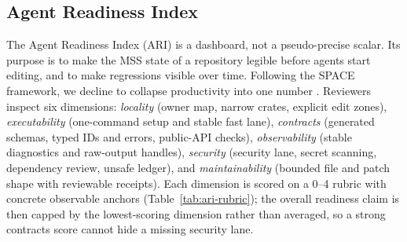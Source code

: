 \documentclass[conference]{IEEEtran}
\newcommand{\ari}{\textnormal{\textsc{ARI}}}
\newcommand{\mss}{\textnormal{\textsc{MSS}}}
\begin{document}
\subsection{Agent Readiness Index}
\label{sec:ari}
The Agent Readiness Index (\ari) is a dashboard, not a pseudo-precise scalar. Its purpose is to make the \mss{} state of a repository legible before agents start editing, and to make regressions visible over time. Following the SPACE framework, we decline to collapse productivity into one number \cite{spaceFramework2021}. Reviewers inspect six dimensions: \emph{locality} (owner map, narrow crates, explicit edit zones), \emph{executability} (one-command setup and stable fast lane), \emph{contracts} (generated schemas, typed IDs and errors, public-API checks), \emph{observability} (stable diagnostics and raw-output handles), \emph{security} (security lane, secret scanning, dependency review, unsafe ledger), and \emph{maintainability} (bounded file and patch shape with reviewable receipts). Each dimension is scored on a 0--4 rubric with concrete observable anchors (Table~\ref{tab:ari-rubric}); the overall readiness claim is then capped by the lowest-scoring dimension rather than averaged, so a strong contracts score cannot hide a missing security lane.
\end{document}
